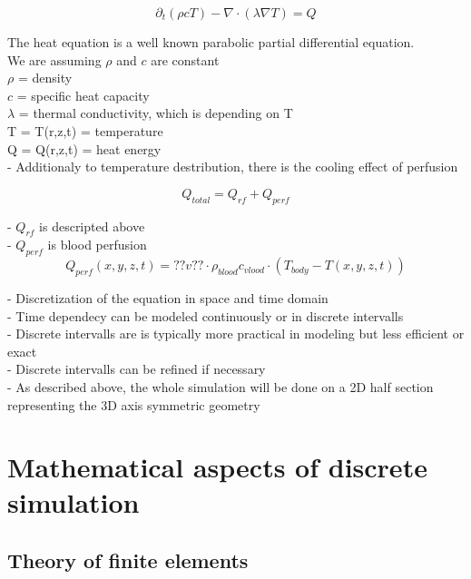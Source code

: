 \documentclass[parskip=half, titlepage=yes, 12pt, BCOR=12mm, DIV=calc]{scrartcl}
\begin{document}
\begin{equation}
    \partial_t (\rho c T) - \nabla \cdot (\lambda \nabla T) = Q
\end{equation}

The heat equation is a well known parabolic partial differential equation. \\

We are assuming $\rho$ and $c$ are constant \\
$\rho$ = density \\
$c$ = specific heat capacity \\
$\lambda$ = thermal conductivity, which is depending on T \\
T = T(r,z,t) = temperature \\
Q = Q(r,z,t) = heat energy \\


- Additionaly to temperature destribution, there is the cooling effect of perfusion 

\begin{equation}
    Q_{total} = Q_{rf} + Q_{perf}
\end{equation}

- $Q_{rf}$ is descripted above \\
- $Q_{perf}$ is blood perfusion \\


\begin{equation}
    Q_{perf}(x,y,z,t) = ??v?? \cdot \rho_{blood} c_{vlood} \cdot (T_{body} - T(x,y,z,t))
\end{equation}


- Discretization of the equation in space and time domain \\
- Time dependecy can be modeled continuously or in discrete intervalls \\
- Discrete intervalls are is typically more practical in modeling but less efficient or exact \\
- Discrete intervalls can be refined if necessary \\

- As described above, the whole simulation will be done on a 2D half section representing the 3D axis symmetric geometry \\ 


\section{Mathematical aspects of discrete simulation}

\subsection{Theory of finite elements}
\end{document}

